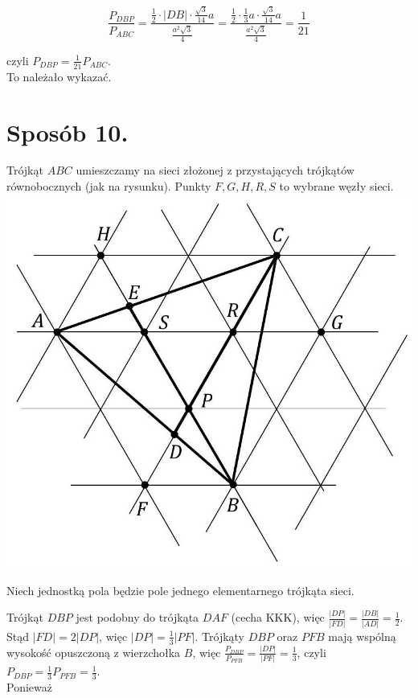 \documentclass[10pt]{article}
\begin{document}
$$
\frac{P_{D B P}}{P_{A B C}}=\frac{\frac{1}{2} \cdot|D B| \cdot \frac{\sqrt{3}}{14} a}{\frac{a^{2} \sqrt{3}}{4}}=\frac{\frac{1}{2} \cdot \frac{1}{3} a \cdot \frac{\sqrt{3}}{14} a}{\frac{a^{2} \sqrt{3}}{4}}=\frac{1}{21}
$$

czyli $P_{D B P}=\frac{1}{21} P_{A B C}$.\\
To należało wykazać.

\section*{Sposób 10.}
Trójkąt $A B C$ umieszczamy na sieci złożonej z przystających trójkątów równobocznych (jak na rysunku). Punkty $F, G, H, R, S$ to wybrane węzły sieci.\\
\includegraphics[max width=\textwidth, center]{2025_02_07_36131546116d12814c9cg-20}

Niech jednostką pola będzie pole jednego elementarnego trójkąta sieci.

Trójkąt $D B P$ jest podobny do trójkąta $D A F$ (cecha KKK), więc $\frac{|D P|}{|F D|}=\frac{|D B|}{|A D|}=\frac{1}{2}$. Stąd $|F D|=2|D P|$, więc $|D P|=\frac{1}{3}|P F|$. Trójkąty $D B P$ oraz $P F B$ mają wspólną wysokość opuszczoną z wierzchołka $B$, więc $\frac{P_{D B P}}{P_{P F B}}=\frac{|D P|}{|P F|}=\frac{1}{3}$, czyli $P_{D B P}=\frac{1}{3} P_{P F B}=\frac{1}{3}$.\\
Ponieważ
\end{document}
